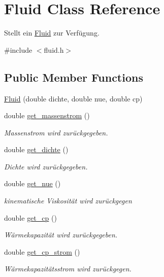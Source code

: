 \hypertarget{class_fluid}{}\section{Fluid Class Reference}
\label{class_fluid}


Stellt ein \hyperlink{class_fluid}{Fluid} zur Verfügung.  




{\ttfamily \#include $<$fluid.\+h$>$}

\subsection*{Public Member Functions}
\begin{DoxyCompactItemize}
\item 
\hyperlink{class_fluid_a2b1fada8a43d2edf1424e4f5915d6e06}{Fluid} (double dichte, double nue, double cp)
\item 
double \hyperlink{class_fluid_afd9451c48ea66d15fdb8226da58da28e}{get\+\_\+massenstrom} ()
\begin{DoxyCompactList}\small\item\em Massenstrom wird zurückgegeben. \end{DoxyCompactList}\item 
double \hyperlink{class_fluid_acb9e3346c0871ad5fefc9d11dcfc3283}{get\+\_\+dichte} ()
\begin{DoxyCompactList}\small\item\em Dichte wird zurückgegeben. \end{DoxyCompactList}\item 
double \hyperlink{class_fluid_ae0031c0e8f70a4fb3dacc34c9725c3c1}{get\+\_\+nue} ()
\begin{DoxyCompactList}\small\item\em kinematische Viskosität wird zurückgegen \end{DoxyCompactList}\item 
double \hyperlink{class_fluid_a86bf10785c4c5822eabf9245f0b39ae0}{get\+\_\+cp} ()
\begin{DoxyCompactList}\small\item\em Wärmekapazität wird zurückgegeben. \end{DoxyCompactList}\item 
double \hyperlink{class_fluid_a5c589565d1bde26bc83125e3e8939796}{get\+\_\+cp\+\_\+strom} ()
\begin{DoxyCompactList}\small\item\em Wärmekapazitätsstrom wird zurückgegen. \end{DoxyCompactList}\item 

\end{DoxyCompactItemize}
